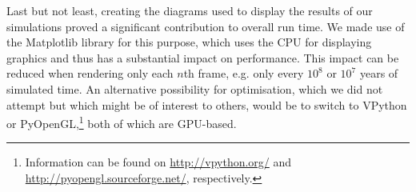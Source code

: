 \documentclass[11pt,twocolumn]{article}
\begin{document}
       
            

            
            
            
            
            
Last but not least, creating the diagrams used to display the results of our simulations proved a significant contribution to overall run time. We made use of the Matplotlib library \cite{Hunter:2007} for this purpose, which uses the CPU for displaying graphics and thus has a substantial impact on performance. This impact can be reduced when rendering only each $n$th frame, e.g. only every $10^8$ or $10^7$ years of simulated time. An alternative possibility for optimisation, which we did not attempt but which might be of interest to others, would be to switch to 
VPython or PyOpenGL,\footnote{
Information can be found on \href{http://vpython.org/}{http://vpython.org/} and 
\href{http://pyopengl.sourceforge.net/}{http://pyopengl.sourceforge.net/}, respectively.} both of which are GPU-based.
            
\end{document}
